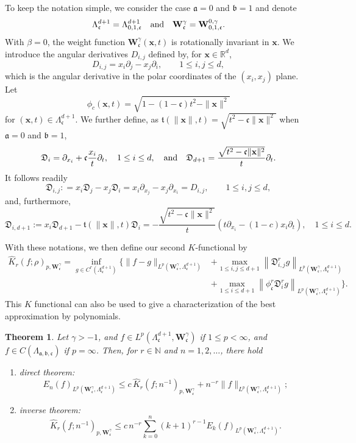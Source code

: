 \documentclass{amsart}
\newtheorem{thm}{Theorem}[section]
\theoremstyle{remark}
\def\fa{{\mathfrak a}}
\def\fb{{\mathfrak b}}
\def\fc{{\mathfrak c}}
\def\ft{{\mathfrak t}}
\def\fD{{\mathfrak D}}
\def\b{{\beta}}
\def\g{{\gamma}}
\def\xb{{\mathbf x}}
\def\Wb{{\mathbf W}}
\def\NN{{\mathbb N}}
\def\RR{{\mathbb R}}
\newcommand{\wh}{\widehat}
\begin{document}
To keep the notation simple, we consider the case $\fa =0$ and $\fb =1$ and denote 
$$
   \Lambda_\fc^{d+1} =  \Lambda_{0, 1, \fc}^{d+1} \quad \hbox{and}\quad \Wb_{\fc}^\g = \Wb_{0, 1,\fc}^{0,\g}. 
$$
With $\b = 0$, the weight function $\Wb_{\fc}^{\g}(\xb,t)$ is rotationally invariant in $\xb$. We introduce 
the angular derivatives $D_{i,j}$ defined by, for $\xb \in \RR^d$, 
$$
        D_{i,j} = x_i \partial_j - x_j \partial_i, \qquad 1 \le i,j \le d,
$$
which is the angular derivative in the polar coordinates of the $(x_i,x_j)$ plane. Let 
$$
  \phi_c(\xb,t) = \sqrt{1-(1-\fc) t^2 - \|\xb\|^2}
$$
for $(\xb, t) \in \Lambda_\fc^{d+1}$. We further define, as $\ft(\|\xb\|,t) = \sqrt{t^2- \fc \|\xb\|^2}$ when $\fa =0$ and $\fb =1$, 
$$
 \fD_i  = \partial_{x_i} + \fc \frac{x_i}{t} \partial_t, \quad 1 \le i\le d, \quad \hbox{and}
     \quad \fD_{d+1} =  \frac{\sqrt{t^2- \fc \|\xb\|^2}}{t}  \partial_t.
$$
It follows readily 
$$
  \fD_{i,j} : = x_i \fD_j - x_j \fD_i = x_i \partial_{x_j} - x_j \partial_{x_i} = D_{i,j}, \qquad 1 \le i, j \le d,
$$
and, furthermore, 
$$
   \fD_{i,d+1} := x_i \fD_{d+1} - \ft(\|\xb\|,t) \fD_i = -  \frac{\sqrt{t^2- \fc \|\xb\|^2}}{t} \left(t \partial_{x_i} - (1-c) x_i \partial_t \right), \quad 1 \le i \le d. 
$$

With these notations, we then define our second $K$-functional by 
\begin{align*}
 \wh K_r(f; \rho)_{p, \Wb_{\fc}^{\g}}  = \inf_{g \in C^r(\Lambda_\fc^{d+1})}
     \Big \{ \| f-g\|_{L^p(\Wb_{\fc}^\g, \Lambda_{\fc}^{d+1})} 
      &  + \max_{1\le i,j\le d+1} \left \| \fD_{i,j}^r g \right \|_{L^p(\Wb_{\fc}^\g, \Lambda_{\fc}^{d+1})} \\
  & + \max_{1\le i \le d+1} \left \| \phi_\fc^r \fD_i^r g \right\|_{L^p(\Wb_{\fc}^\g, \Lambda_{\fc}^{d+1})}   \Big \}.  
\end{align*}
This $K$ functional can also be used to give a characterization of the best approximation by polynomials. 

\begin{thm} \label{thm:approx-d-2}
Let $\g> -1$, and $f \in L^p(\Lambda_{\fc}^{d+1},\Wb_{\fc}^\g)$ if $1 \le p < \infty$, 
and $f \in C(\Lambda_{\fa,\fb,\fc})$ if $p = \infty$. Then, for $r \in \NN$ and $n =1,2,\ldots$, there hold 
\begin{enumerate} [\rm (i)]
\item {\it direct theorem}:
$$
    E_n(f)_{L^p(\Wb_{\fc}^{\g},\Lambda_{\fc}^{d+1})} 
        \le c \, \wh K_r(f;  n^{-1})_{p, \Wb_{\fc}^\g} +n^{-r} \|f\|_{L^p(\Wb_{\fc}^{\g},\Lambda_{\fc}^{d+1})};
$$
\item {\it inverse theorem}:  
$$
   \wh K_r(f; n^{-1})_{p, \Wb_{\fc}^{\g}} 
         \le c \,n^{-r} \sum_{k=0}^n (k+1)^{r-1} E_k(f)_{L^p(\Wb_{\fc}^{\g},\Lambda_{\fc}^{d+1})}.
$$
\end{enumerate}
\end{thm}
\end{document}
